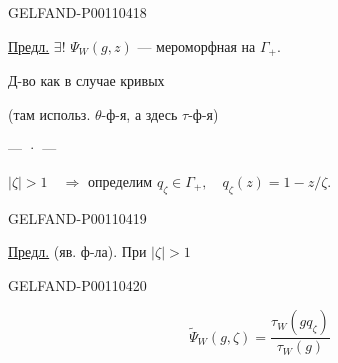 \begin{GelfandAdjacentEvidence}{GELFAND-P001104}{18}


\underline{Предл.} $\exists!$ $\Psi_W(g,z)$ — мероморфная на $\Gamma_+$.

Д-во как в случае кривых

(там использ. $\theta$-ф-я, а здесь $\tau$-ф-я)

\begin{center}— · —\end{center}
$\lvert\zeta\rvert>1\quad\Rightarrow$ определим
$q_\zeta\in\Gamma_+,\quad q_\zeta(z)=1-z/\zeta$.
\end{GelfandAdjacentEvidence}
\begin{GelfandAdjacentEvidence}{GELFAND-P001104}{19}


\underline{Предл.} (яв. ф-ла). При $\lvert\zeta\rvert>1$
\end{GelfandAdjacentEvidence}
\begin{GelfandAdjacentEvidence}{GELFAND-P001104}{20}

\[
\widetilde{\Psi}_W(g,\zeta)=\frac{\tau_W(gq_\zeta)}{\tau_W(g)}
\]
\end{GelfandAdjacentEvidence}



